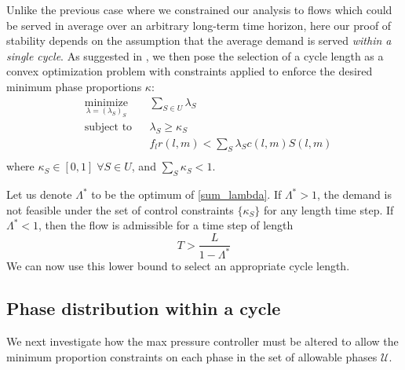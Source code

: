 Unlike the previous case where we constrained our analysis to flows which could be served in average over an arbitrary long-term time horizon, here our proof of stability depends on the assumption that the average demand is served \textit{within a single cycle}. As suggested in \cite{MaxPressureStochastic}, we then pose the selection of a cycle length as a convex optimization problem with constraints applied to enforce the desired minimum phase proportions $\kappa$:
\begin{equation} \label{sum_lambda}
\begin{aligned}
& \underset{\lambda = (\lambda_{S})_{S}}{\text{minimize}}
& & \sum_{S\in U} \lambda_{S} \\
& \text{subject to}
& &  \lambda_{S} \geq \kappa_S\\
&&& f_{l}r(l,m) < \sum_{S}\lambda_{S} c(l,m)S(l,m)\\
\end{aligned}
\end{equation}
where $\kappa_S \in [0,1] \; \forall S\in U$, and $\sum_S \kappa_S <1$. 
%

Let us denote $\Lambda^{*}$ to be the optimum of  \eqref{sum_lambda}. If $\Lambda^* > 1$, the demand is not feasible under the set of control constraints $\{\kappa_S\}$ for any length time step. If $\Lambda^* < 1$, then the flow is admissible for a time step of length 
\begin{equation} T > \frac{L}{1-\Lambda^*} \label{minTime} \end{equation} 
We can now use this lower bound to select an appropriate cycle length. 


\subsection*{Phase distribution within a cycle}
We next investigate how the max pressure controller must be altered to allow the minimum proportion constraints on each phase in the set of allowable phases $\mathcal U$.

